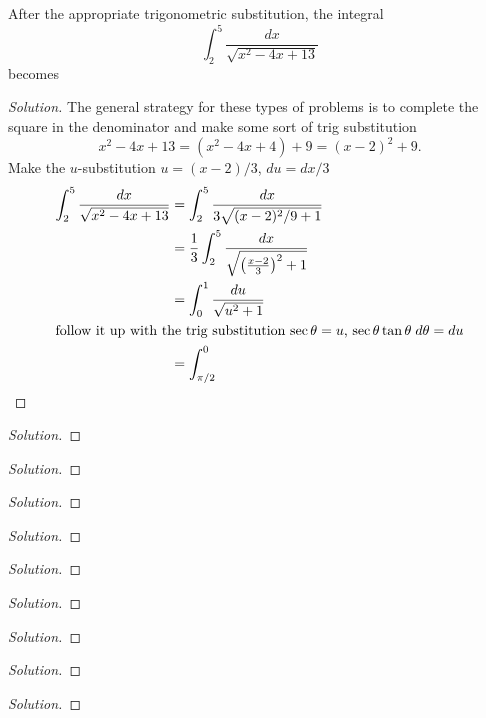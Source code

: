 \begin{problem}
After the appropriate trigonometric substitution, the integral
\[
\int_2^5\frac{dx}{\sqrt{x^2-4x+13}}
\]
becomes
\end{problem}
\begin{proof}[Solution]
The general strategy for these types of problems is to complete the square
in the denominator and make some sort of trig substitution
\[
x^2-4x+13=
\left(x^2-4x+4\right)+9=
(x-2)^2+9.
\]
Make the $u$-substitution $u=(x-2)/3$, $du=dx/3$
\begin{align*}
\int_2^5\frac{dx}{\sqrt{x^2-4x+13}}
&=\int_2^5\frac{dx}{3\sqrt{(x-2)^2/9+1}}\\
&=\frac{1}{3}\int_2^5\frac{dx}{\sqrt{\left(\frac{x-2}{3}\right)^2+1}}\\
&=\int_0^1\frac{du}{\sqrt{u^2+1}}\\
\intertext{follow it up with the trig substitution $\sec\theta=u$,
  $\sec\theta\tan\theta\;d\theta=du$}
&=\int_{\pi/2}^0
\end{align*}
\end{proof}
\begin{problem}
\end{problem}
\begin{proof}[Solution]
\end{proof}
\begin{problem}
\end{problem}
\begin{proof}[Solution]
\end{proof}
\begin{problem}
\end{problem}
\begin{proof}[Solution]
\end{proof}
\begin{problem}
\end{problem}
\begin{proof}[Solution]
\end{proof}
\begin{problem}
\end{problem}
\begin{proof}[Solution]
\end{proof}
\begin{problem}
\end{problem}
\begin{proof}[Solution]
\end{proof}
\begin{problem}
\end{problem}
\begin{proof}[Solution]
\end{proof}
\begin{problem}
\end{problem}
\begin{proof}[Solution]
\end{proof}
\begin{problem}
\end{problem}
\begin{proof}[Solution]
\end{proof}

